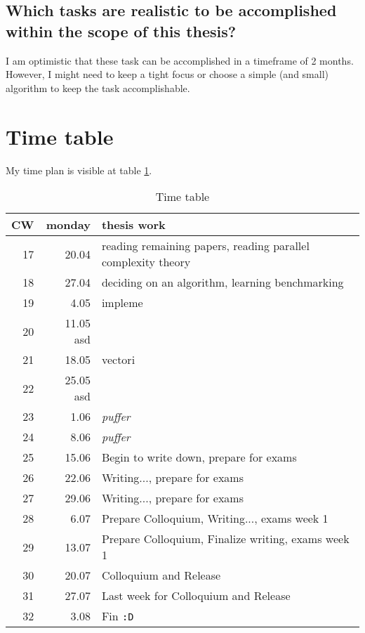 \documentclass{article}
\begin{document}
    \subsection{Which tasks are realistic to be accomplished within the scope of this thesis?}
    I am optimistic that these task can be accomplished in a timeframe of 2 months. However, I might need to keep a tight focus or
    choose a simple (and small) algorithm to keep the task accomplishable.

    \section{Time table}
    My time plan is visible at table \ref{timetable}.
    \begin{table}[h]
        \begin{center}
        \caption{Time table} %
        \label{timetable}
        \begin{tabular}{rrl}
            \toprule
            CW & monday & thesis work \\
            \midrule
            17 & 20.04 & reading remaining papers, reading parallel complexity theory \\
            18 & 27.04 & deciding on an algorithm, learning benchmarking  \\
            19 & 4.05  & impleme \\
            20 & 11.05  asd \\
            21 & 18.05 & vectori \\
            22 & 25.05 asd \\
            23 & 1.06  & \textit{puffer} \\
            24 & 8.06  & \textit{puffer} \\
            25 & 15.06 & Begin to write down, prepare for exams\\
            26 & 22.06 & Writing..., prepare for exams \\
            27 & 29.06 & Writing..., prepare for exams \\
            28 & 6.07  & Prepare Colloquium, Writing..., exams week 1 \\
            29 & 13.07 & Prepare Colloquium, Finalize writing, exams week 1 \\
            30 & 20.07 & Colloquium and Release \\
            31 & 27.07 & Last week for Colloquium and Release \\
            32 & 3.08  & Fin \texttt{:D} \\
        \end{tabular}
        \end{center}
    \end{table}


    \newpage


    \newpage
\end{document}
